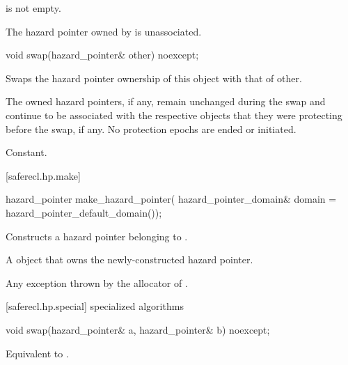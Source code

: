 \begin{itemdescr}

\pnum
\expects
{} is not empty.

\pnum
\ensures
The hazard pointer owned by  is unassociated.

\end{itemdescr}

\begin{itemdecl}
void swap(hazard_pointer& other) noexcept;
\end{itemdecl}

\begin{itemdescr}

\pnum
\effects 
Swaps the hazard pointer ownership of this object with that of other. \begin{note} The owned hazard pointers, if any, remain unchanged during the swap and continue to be associated with the respective objects that they were protecting before the swap, if any. No protection epochs are ended or initiated. \end{note}

\pnum
\complexity 
Constant.

\end{itemdescr}

[saferecl.hp.make]{}

\begin{itemdecl}
hazard_pointer make_hazard_pointer(
  hazard_pointer_domain& domain = hazard_pointer_default_domain());
\end{itemdecl}

\begin{itemdescr}

\pnum
\effects 
Constructs a hazard pointer belonging to .

\pnum
\returns 
A  object that owns the newly-constructed hazard pointer.

\pnum
\throws 
Any exception thrown by the allocator of .

\end{itemdescr}

[saferecl.hp.special]{ specialized algorithms}

\begin{itemdecl}
void swap(hazard_pointer& a, hazard_pointer& b) noexcept;
\end{itemdecl}

\begin{itemdescr}

\pnum
\effects 
Equivalent to .

\end{itemdescr}
